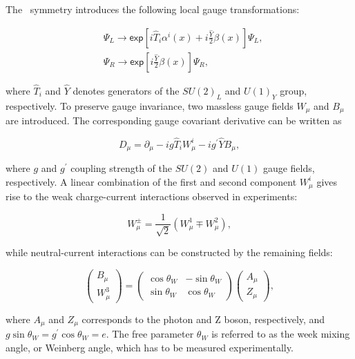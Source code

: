 The \ew~symmetry introduces the following local gauge transformations:

\begin{equation}
\begin{split}
&\Psi_{L}\rightarrow\textsf{exp}[i\hat{T}_{i}\alpha^{i}(x)+i\frac{\hat{Y}}{2}\beta(x)]\Psi_{L},\\
&\Psi_{R}\rightarrow\textsf{exp}[i\frac{\hat{Y}}{2}\beta(x)]\Psi_{R},
\end{split}
\end{equation}

where $\hat{T}_{i}$ and $\hat{Y}$ denotes generators of the $SU(2)_{L}$ and $U(1)_{Y}$ group, respectively. To preserve gauge invariance, two massless gauge fields $W_{\mu}$ and $B_{\mu}$ are introduced. The corresponding gauge covariant derivative can be written as

\begin{equation}
\label{eq:EWCov}
D_{\mu}=\partial_{\mu}-ig\hat{T}_{i}W_{\mu}^{i}-ig^{\prime}\hat{Y}B_{\mu},
\end{equation}

where $g$ and $g^{\prime}$ coupling strength of the $SU(2)$ and $U(1)$ gauge fields, respectively. A linear combination of the first and second component $W_{\mu}^{i}$ gives rise to the weak charge-current interactions observed in experiments:

\begin{equation}
W^{\pm}_{\mu}=\frac{1}{\sqrt{2}}(W^{1}_{\mu}\mp W^{2}_{\mu}),
\end{equation}

while neutral-current interactions can be constructed by the remaining fields:

\begin{equation}
\label{}
\begin{pmatrix}B_{\mu}\\W_{\mu}^{3}\end{pmatrix}=\begin{pmatrix}\cos\theta_{W}&-\sin\theta_{W}\\\sin\theta_{W}&\cos\theta_{W}\end{pmatrix}\begin{pmatrix}A_{\mu}\\Z_{\mu}\end{pmatrix},
\end{equation}

where $A_{\mu}$ and $Z_{\mu}$ corresponds to the photon and Z boson, respectively, and $g\sin\theta_{W}=g^{\prime}\cos\theta_{W}=e$. The free parameter $\theta_{W}$ is referred to as the week mixing angle, or Weinberg angle, which has to be measured experimentally.

